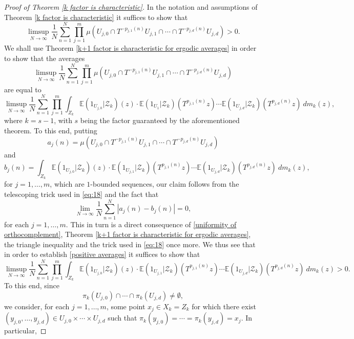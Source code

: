 \documentclass[reqno]{amsart}
\theoremstyle{definition}
\theoremstyle{remark}
\begin{document}
\begin{proof}[Proof of Theorem \ref{k factor is characteristic}]
In the notation and assumptions of Theorem \ref{k factor is characteristic} it suffices to show that 
\begin{equation}\label{positive averages}
\limsup_{N\to \infty} \frac{1}{N}\sum_{n=1}^N \prod_{j=1}^m \mu(U_{j,0}\cap T^{-p_{j,1}(n)}U_{j,1}\cap \cdots \cap T^{-p_{j,d}(n)}U_{j,d})>0.  
\end{equation}
We shall use Theorem \ref{k+1 factor is characteristic for ergodic averages} in order to show that the averages 
$$\limsup_{N\to \infty} \frac{1}{N}\sum_{n=1}^N \prod_{j=1}^m \mu(U_{j,0}\cap T^{-p_{j,1}(n)}U_{j,1}\cap \cdots \cap T^{-p_{j,d}(n)}U_{j,d}) $$
are equal to 
$$\limsup_{N\to \infty} \frac{1}{N}\sum_{n=1}^N \prod_{j=1}^m \int_{Z_{k}} \mathbb{E}(\mathrm{1}_{U_{j,0}} | \mathcal{Z}_{k})(z) \cdot \mathbb{E}(\mathrm{1}_{U_1} | \mathcal{Z}_{k})(T^{p_{j,1}(n)}z)\cdots \mathbb{E}(\mathrm{1}_{U_{j,d}} | \mathcal{Z}_{k})(T^{p_{j,d}(n)}z)\ dm_{k}(z),$$
where $k=s-1$, with $s$ being the factor guaranteed by the aforementioned theorem. To this end, putting $$a_j(n)=\mu(U_{j,0}\cap T^{-p_{j,1}(n)}U_{j,1}\cap \cdots \cap T^{-p_{j,d}(n)}U_{j,d}) $$ 
and 
$$b_j(n)=\int_{Z_{k}} \mathbb{E}(\mathrm{1}_{U_{j,0}} | \mathcal{Z}_{k})(z) \cdot \mathbb{E}(\mathrm{1}_{U_{j,1}} | \mathcal{Z}_{k})(T^{p_{j,1}(n)}z)\cdots \mathbb{E}(\mathrm{1}_{U_{j,d}} | \mathcal{Z}_{k})(T^{p_{j,d}(n)}z)\ dm_{k}(z),$$
for $j=1,\ldots,m$, which are $1$-bounded sequences, 
our claim follows from the telescoping trick used in \eqref{eq:18} and the fact that
$$\lim_{N\to \infty} \frac{1}{N}\sum_{n=1}^N \left| a_j(n)-b_j(n) \right|=0,$$
for each $j=1,\ldots,m$. This in turn is a direct consequence of \eqref{uniformity of orthocomplement}, Theorem 
\ref{k+1 factor is characteristic for ergodic averages}, the triangle inequality and the trick used in \eqref{eq:18} once more. We thus see that in order to establish \eqref{positive averages} it suffices to show that 
\begin{equation}\label{positive averages in k+1 nilfactor}
\limsup_{N\to \infty} \frac{1}{N}\sum_{n=1}^N \prod_{j=1}^m \int_{Z_{k}} \mathbb{E}(\mathrm{1}_{U_{j,0}} | \mathcal{Z}_{k})(z) \cdot \mathbb{E}(\mathrm{1}_{U_{j,1}} | \mathcal{Z}_{k})(T^{p_{j,1}(n)}z)\cdots \mathbb{E}(\mathrm{1}_{U_{j,d}} | \mathcal{Z}_{k})(T^{p_{j,d}(n)}z)\ dm_{k}(z)>0.    
\end{equation}
To this end, since 
$$\pi_k(U_{j,0}) \cap \cdots \cap \pi_k(U_{j,d}) \neq \emptyset, $$
    we consider, for each $j=1,\ldots,m$, some point $x_j\in X_{k}=Z_{k}$ for which there exist $(y_{j,0},\ldots,y_{j,d})\in U_{j,0}\times \cdots \times U_{j,d}$ such that $\pi_{k}(y_{j,0})=\cdots=\pi_{k}(y_{j,d})=x_j$. In particular, 

\end{proof}
\end{document}
